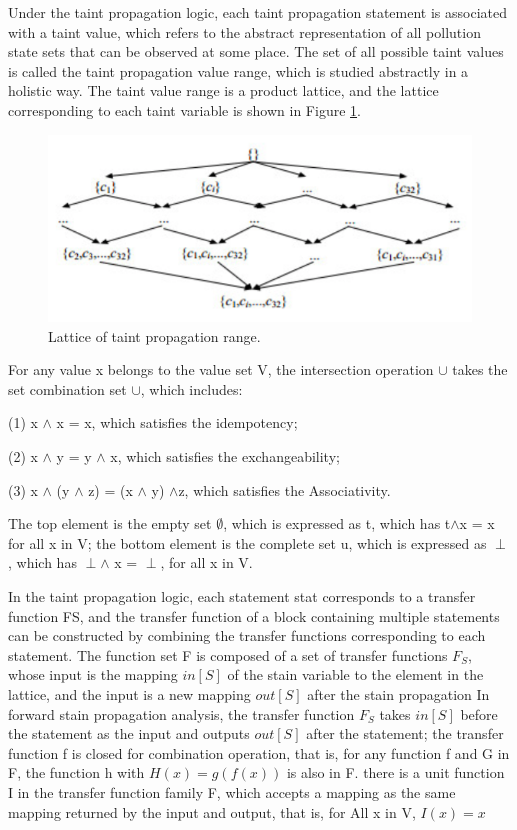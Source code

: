 \documentclass{article}
\begin{document}
Under the taint propagation logic, each taint propagation statement is associated with a taint value, which refers to the abstract representation of all pollution state sets that can be observed at some place. The set of all possible taint values is called the taint propagation value range, which is studied abstractly in a holistic way. The taint value range is a product lattice, and the lattice corresponding to each taint variable is shown in Figure \ref{fig:Lattice}.

\begin{figure}[ht]
  \centering
  \includegraphics[scale=0.4]{Lattice.png}
  \caption{Lattice of taint propagation range.}
  \label{fig:Lattice}
\end{figure}
For any value x belongs to the value set V, the intersection operation $\cup$ takes the set combination set $\cup$, which includes: 

(1) x $ \wedge $ x = x, which satisfies the idempotency; 

(2) x $ \wedge $ y = y $ \wedge $ x, which satisfies the exchangeability;

(3) x $ \wedge $ (y $ \wedge $ z) = (x $ \wedge $ y) $ \wedge $z, which satisfies the Associativity. 

The top element is the empty set $\emptyset$, which is expressed as t, which has t$ \wedge $x = x for all x in V; the bottom element is the complete set u, which is expressed as $\perp$, which has $\perp\wedge$ x = $\perp$, for all x in V.

In the taint propagation logic, each statement stat corresponds to a transfer function FS, and the transfer function of a block containing multiple statements can be constructed by combining the transfer functions corresponding to each statement. The function set F is composed of a set of transfer functions $F_{S}$, whose input is the mapping $in[S]$ of the stain variable to the element in the lattice, and the input is a new mapping $out[S]$ after the stain propagation In forward stain propagation analysis, the transfer function $F_{S}$ takes $in[S]$ before the statement as the input and outputs $out[S]$ after the statement; the transfer function f is closed for combination operation, that is, for any function f and G in F, the function h with $H(x) = g(f(x))$ is also in F. there is a unit function I in the transfer function family F, which accepts a mapping as the same mapping returned by the input and output, that is, for All x in V, $I(x) = x$
\end{document}
